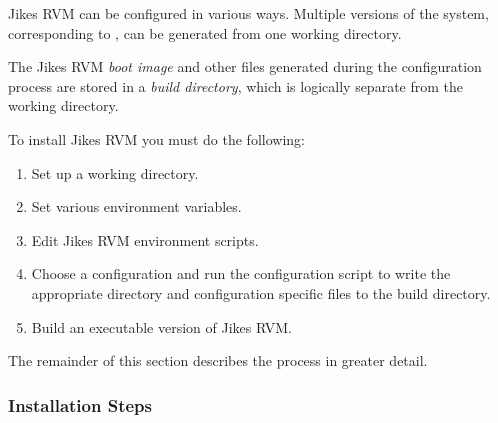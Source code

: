 %
Jikes RVM can be configured in various ways.  Multiple versions of the system,
corresponding to , can be generated from 
one working directory.   

The Jikes RVM {\em boot image} and other files generated during the 
configuration process
are stored in a {\em build directory},
 which is logically separate from the working directory. 

To install Jikes RVM  you must do the following:
\begin{enumerate}
\item Set up a working directory.
\item Set various environment variables.
\item Edit Jikes RVM environment scripts.
\item Choose a configuration and run the configuration script to write
the appropriate directory and configuration specific files to the
build directory.
\item Build an executable version of Jikes RVM.\@
\end{enumerate}

The remainder of this section describes the process in greater detail.

\subsubsection{Installation Steps}%
\label{sub-sub-sec:InstallationSteps}%
\label{sec:manual-classpath-root}%
\label{single-virtual-processor-subsubsection}

